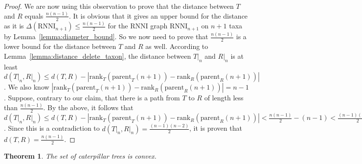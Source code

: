 \documentclass{amsart}
\newcommand{\parent}{\mathrm{parent}}
\newcommand{\rank}{\mathrm{rank}}
\newcommand{\rnni}{\mathrm{RNNI}}
\newtheorem{theorem}[definition]{Theorem}
\begin{document}
\begin{proof}
    We are now using this observation to prove that the distance between $T$ and $R$ equals $\frac{n(n-1)}{2}$.
    It is obvious that it gives an upper bound for the distance as it is $\Delta(\rnni_{n+1}) \leq \frac{n(n-1)}{2}$ for the $\rnni$ graph $\rnni_{n+1}$ on $n+1$ taxa by Lemma~\ref{lemma:diameter_bound}.
    So we now need to prove that $\frac{n(n-1)}{2}$ is a lower bound for the distance between $T$ and $R$ as well.
    According to Lemma~\ref{lemma:distance_delete_taxon}, the distance between $T{\big|}_n$ and $R{\big|}_n$ is at least $d(T{\big|}_n, R{\big|}_n) \leq d(T,R) - |\rank_T(\parent_T(n+1)) - \rank_R(\parent_R(n+1))|$.
    We also know $|\rank_T(\parent_T(n+1)) - \rank_R(\parent_R(n+1))| = n-1$.
    Suppose, contrary to our claim, that there is a path from $T$ to $R$ of length less than $\frac{n(n-1)}{2}$.
    By the above, it follows that $d(T{\big|}_n, R{\big|}_n) \leq d(T,R) - |\rank_T(\parent_T(n+1)) - \rank_R(\parent_R(n+1))| < \frac{n(n-1)}{2} - (n-1) < \frac{(n-1)(n-2)}{2}$.
    Since this is a contradiction to $d(T{\big|}_n, R{\big|}_n) = \frac{(n-1)(n-2)}{2}$, it is proven that $d(T,R) = \frac{n(n-1)}{2} $.
\end{proof}

\begin{theorem}
    The set of caterpillar trees is convex.
    \label{thm:caterpillar_convex}
\end{theorem}
\end{document}
